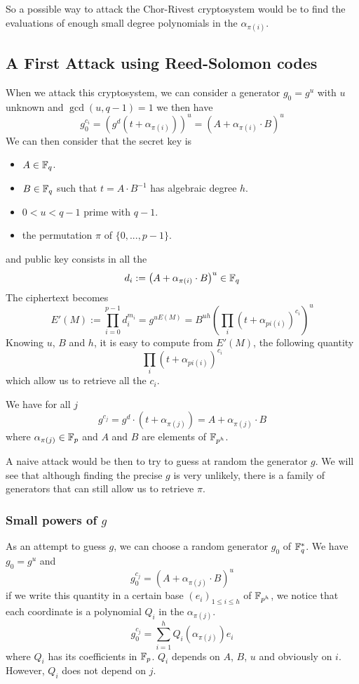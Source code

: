 \documentclass[12pt,a4paper,titlepage]{article}
\newcommand{\GF}[1]{\F_{#1}}
\begin{document}
So a possible way to attack the Chor-Rivest cryptosystem would be to find the evaluations of enough small degree polynomials in the $\alpha_{\pi(i)}$.



\subsection{A First Attack using Reed-Solomon codes}


When we attack this cryptosystem, we can consider a generator $g_0 = g^u$ with $u$ unknown and $\gcd(u, q-1) = 1$ we then have
$$ g_0^{c_i} = \left( g^d \left( t + \alpha_{\pi(i)} \right) \right)^u = \left(A + \alpha_{\pi(i)} \cdot B\right)^u$$
We can then consider that the secret key is
\begin{itemize}
\item $A \in \mathbb{F}_q$.
\item $B \in \mathbb{F}_q$ such that $t = A\cdot B^{-1}$ has algebraic degree $h$.
\item $0 < u < q-1$ prime with $q-1$.
\item the permutation $\pi$ of $\{ 0, ... , p-1 \}$.
\end{itemize}
and public key consists in all the
$$ d_i := \left(A + \alpha_{\pi(i)} \cdot B\right)^u \in \mathbb{F}_q$$
The ciphertext becomes
$$ E'(M) := \prod_{i=0}^{p-1} d_i^{m_i} = g^{uE(M)} = B^{uh} \left( \prod_i \left( t + \alpha_{pi(i)}\right)^{c_i} \right)^u$$
Knowing $u$, $B$ and $h$, it is easy to compute from $E'(M)$, the following quantity
$$ \prod_i \left( t + \alpha_{pi(i)}\right)^{c_i} $$
which allow us to retrieve all the $c_i$.



We have for all $j$
$$ g^{c_j} = g^d \cdot (t + \alpha_{\pi(j)} ) = A + \alpha_{\pi(j)} \cdot B $$
where $\alpha_{\pi(j)} \in \GF{p}$ and $A$ and $B$ are elements of $\GF{p^h}$.

A naive attack would be then to try to guess at random the generator $g$. We will see that although finding the precise $g$ is very unlikely, there is a family of generators that can still allow us to retrieve $\pi$.

\subsubsection{Small powers of $g$}

As an attempt to guess $g$, we can choose a random generator $g_0$ of $\GF{q}^{*}$. We have $g_0 = g^u$ and
$$ g_0 ^{c_j} = (A + \alpha_{\pi(j)} \cdot B)^u $$
if we write this quantity in a certain base $(e_i)_{1 \leq i \leq h}$ of $\GF{p^h}$, we notice that each coordinate is a polynomial $Q_i$ in the $\alpha_{\pi(j)}$.
$$ g_0^{c_j} = \sum_{i=1}^h Q_i(\alpha_{\pi(j)}) e_i $$
where $Q_i$ has its coefficients in $\GF{p}$.
$Q_i$ depends on $A$, $B$, $u$ and obviously on $i$. However, $Q_i$ does not depend on $j$.
\end{document}
